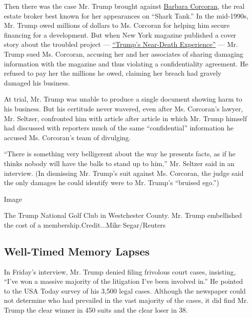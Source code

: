 Then there was the case Mr. Trump brought against
\href{http://topics.nytimes3xbfgragh.onion/top/reference/timestopics/people/c/barbara_corcoran/index.html}{Barbara
Corcoran}, the real estate broker best known for her appearances on
``Shark Tank.'' In the mid-1990s, Mr. Trump owed millions of dollars to
Ms. Corcoran for helping him secure financing for a development. But
when New York magazine published a cover story about the troubled
project ---
\href{https://books.google.com/books?id=VeMCAAAAMBAJ\&lpg=PP1\&dq=trump\&pg=PP1\#v=onepage\&q\&f=false}{``Trump's
Near-Death Experience''} --- Mr. Trump sued Ms. Corcoran, accusing her
and her associates of sharing damaging information with the magazine and
thus violating a confidentiality agreement. He refused to pay her the
millions he owed, claiming her breach had gravely damaged his business.

At trial, Mr. Trump was unable to produce a single document showing harm
to his business. But his certitude never wavered, even after Ms.
Corcoran's lawyer, Mr. Seltzer, confronted him with article after
article in which Mr. Trump himself had discussed with reporters much of
the same ``confidential'' information he accused Ms. Corcoran's team of
divulging.

``There is something very belligerent about the way he presents facts,
as if he thinks nobody will have the balls to stand up to him,'' Mr.
Seltzer said in an interview. (In dismissing Mr. Trump's suit against
Ms. Corcoran, the judge said the only damages he could identify were to
Mr. Trump's ``bruised ego.'')

Image

The Trump National Golf Club in Westchester County. Mr. Trump
embellished the cost of a membership.Credit...Mike Segar/Reuters

\hypertarget{well-timed-memory-lapses}{%
\subsection{Well-Timed Memory Lapses}\label{well-timed-memory-lapses}}

In Friday's interview, Mr. Trump denied filing frivolous court cases,
insisting, ``I've won a massive majority of the litigation I've been
involved in.'' He pointed to the USA Today survey of his 3,500 legal
cases. Although the newspaper could not determine who had prevailed in
the vast majority of the cases, it did find Mr. Trump the clear winner
in 450 suits and the clear loser in 38.

